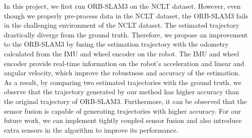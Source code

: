 \documentclass[letterpaper, 10 pt, conference]{ieeeconf}  %
\begin{document}
In this project, we first run ORB-SLAM3 on the NCLT dataset. However, even though we properly pre-process data in the NCLT dataset, the ORB-SLAM3 fails in the challenging environment of the NCLT dataset. The estimated trajectory drastically diverge from the ground truth. Therefore, we propose an improvement to the ORB-SLAM3 by fusing the estimation trajectory with the odometry calculated from the IMU and wheel encoder on the robot. The IMU and wheel encoder provide real-time information on the robot's acceleration and linear and angular velocity, which improve the robustness and accuracy of the estimation. As a result, by comparing two estimated trajectories with the ground truth, we observe that the trajectory generated by our method has higher accuracy than the original trajectory of ORB-SLAM3. Furthermore, it can be observed that the sensor fusion is capable of generating trajectories with higher accuracy. For our future work, we can implement tightly coupled sensor fusion and also introduce extra sensors in the algorithm to improve its performance.


\addtolength{\textheight}{-12cm}   %








\newpage
\end{document}
